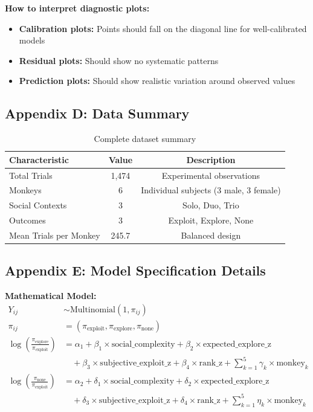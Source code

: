 \documentclass[11pt]{article}
\begin{document}
\textbf{How to interpret diagnostic plots:}
\begin{itemize}
    \item \textbf{Calibration plots:} Points should fall on the diagonal line for well-calibrated models
    \item \textbf{Residual plots:} Should show no systematic patterns
    \item \textbf{Prediction plots:} Should show realistic variation around observed values
\end{itemize}

\subsection{Appendix D: Data Summary}

\begin{table}[h]
\centering
\begin{tabular}{lcc}
\toprule
\textbf{Characteristic} & \textbf{Value} & \textbf{Description} \\
\midrule
Total Trials & 1,474 & Experimental observations \\
Monkeys & 6 & Individual subjects (3 male, 3 female) \\
Social Contexts & 3 & Solo, Duo, Trio \\
Outcomes & 3 & Exploit, Explore, None \\
Mean Trials per Monkey & 245.7 & Balanced design \\
\bottomrule
\end{tabular}
\caption{Complete dataset summary}
\end{table}

\subsection{Appendix E: Model Specification Details}

\textbf{Mathematical Model:}
\begin{align}
Y_{ij} &\sim \text{Multinomial}(1, \pi_{ij}) \\
\pi_{ij} &= (\pi_{\text{exploit}}, \pi_{\text{explore}}, \pi_{\text{none}}) \\
\log\left(\frac{\pi_{\text{explore}}}{\pi_{\text{exploit}}}\right) &= \alpha_1 + \beta_1 \times \text{social\_complexity} + \beta_2 \times \text{expected\_explore\_z} \\
&\quad + \beta_3 \times \text{subjective\_exploit\_z} + \beta_4 \times \text{rank\_z} + \sum_{k=1}^{5} \gamma_k \times \text{monkey}_k \\
\log\left(\frac{\pi_{\text{none}}}{\pi_{\text{exploit}}}\right) &= \alpha_2 + \delta_1 \times \text{social\_complexity} + \delta_2 \times \text{expected\_explore\_z} \\
&\quad + \delta_3 \times \text{subjective\_exploit\_z} + \delta_4 \times \text{rank\_z} + \sum_{k=1}^{5} \eta_k \times \text{monkey}_k
\end{align}
\end{document}
